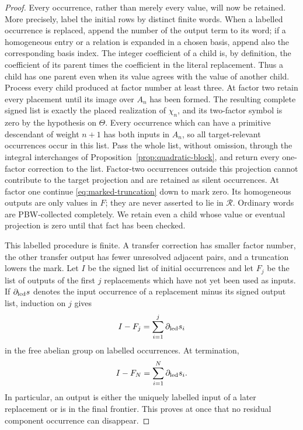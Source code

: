 \documentclass[11pt]{amsart}
\theoremstyle{remark}
\newcommand{\Rel}{\mathcal R}
\begin{document}
\begin{proof}
Every occurrence, rather than merely every value, will now be retained.
More precisely, label the initial rows by distinct finite words.  When a
labelled occurrence is replaced, append the number of the output term to
its word; if a homogeneous entry or a relation is expanded in a chosen
basis, append also the corresponding basis index.  The integer
coefficient of a child is, by definition, the coefficient of its parent
times the coefficient in the literal replacement.  Thus a child has one
parent even when its value agrees with the value of another child.
Process every child produced at factor number at least three.  At factor
two retain every placement until its image over $A_n$ has been formed.
The resulting complete signed list is exactly the placed realization of
$\chi_n$, and its two-factor symbol is zero by the hypothesis on
$\Theta$.  Every occurrence which can have a primitive descendant of
weight $n+1$ has both inputs in $A_n$, so all target-relevant
occurrences occur in this list.  Pass the whole list, without omission,
through the integral interchanges of
Proposition~\ref{prop:quadratic-block}, and return every one-factor
correction to the list.  Factor-two occurrences outside this projection
cannot contribute to the target projection and are retained as silent
occurrences.  At factor one continue
\eqref{eq:marked-truncation} down to mark zero.  Its homogeneous outputs
are only values in $F$; they are never asserted to lie in $\Rel$.
Ordinary words are PBW-collected completely.  We retain even a child
whose value or eventual projection is zero until that fact has been
checked.

This labelled procedure is finite.  A transfer correction has smaller
factor number, the other transfer output has fewer unresolved adjacent
pairs, and a truncation lowers the mark.  Let $I$ be the signed list of
initial occurrences and let $F_j$ be the list of outputs of the first
$j$ replacements which have not yet been used as inputs.  If
$\partial_{\rm led}s$ denotes the input occurrence of a replacement
minus its signed output list, induction on $j$ gives
\begin{equation}\label{eq:prefix-ledger}
 I-F_j=\sum_{i=1}^{j}\partial_{\rm led}s_i
\end{equation}
in the free abelian group on labelled occurrences.  At termination,
\begin{equation}\label{eq:complete-ledger}
 I-F_N=\sum_{i=1}^{N}\partial_{\rm led}s_i.             
\end{equation}
In particular, an output is either the uniquely labelled input of a
later replacement or is in the final frontier.  This proves at once
that no residual component occurrence can disappear.


\end{proof}
\end{document}
